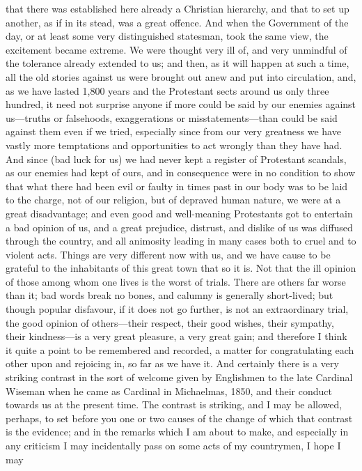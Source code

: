 that there was established here already a Christian hierarchy, and
that to set up another, as if in its stead, was a great offence. And
when the Government of the day, or at least some very distinguished
statesman, took the same view, the excitement became extreme. We were
thought very ill of, and very unmindful of the tolerance already
extended to us; and then, as it will happen at such a time, all the
old stories against us were brought out anew and put into circulation,
and, as we have lasted 1,800 years and the Protestant sects around us
only three hundred, it need not surprise anyone if more could be said
by our enemies against us—truths or falsehoods, exaggerations or
misstatements—than could be said against them even if we tried,
especially since from our very greatness we have vastly more
temptations and opportunities to act wrongly than they have had. And
since (bad luck for us) we had never kept a register of Protestant
scandals, as our enemies had kept of ours, and in consequence were in
no condition to show that what there had been evil or faulty in times
past in our body was to be laid to the charge, not of our religion,
but of depraved human nature, we were at a great disadvantage; and
even good and well-meaning Protestants got to entertain a bad opinion
of us, and a great prejudice, distrust, and dislike of us was diffused
through the country, and all animosity leading in many cases both to
cruel and to violent acts. Things are very different now with us, and
we have cause to be grateful to the inhabitants of this great town
that so it is. Not that the ill opinion of those among whom one lives
is the worst of trials. There are others far worse than it; bad words
break no bones, and calumny is generally short-lived; but though
popular disfavour, if it does not go further, is not an extraordinary
trial, the good opinion of others—their respect, their good wishes,
their sympathy, their kindness—is a very great pleasure, a very
great gain; and therefore I think it quite a point to be remembered
and recorded, a matter for congratulating each other upon and
rejoicing in, so far as we have it. And certainly there is a very
striking contrast in the sort of welcome given by Englishmen to the
late Cardinal Wiseman when he came as Cardinal in Michaelmas, 1850,
and their conduct towards us at the present time. The contrast is
striking, and I may be allowed, perhaps, to set before you one or two
causes of the change of which that contrast is the evidence; and in
the remarks which I am about to make, and especially in any criticism
I may incidentally pass on some acts of my countrymen, I hope I may
